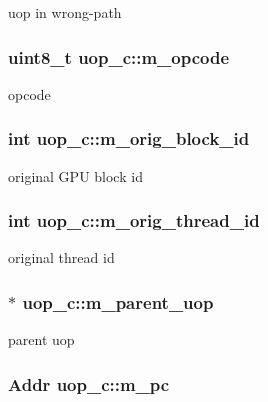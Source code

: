 \label{classuop__c_ad596fa360563f1642c09047c59481abe}
uop in wrong-\/path \hypertarget{classuop__c_aa9d298c300f17b0ffd24b3c994ddf667}{
\subsubsection[{m\_\-opcode}]{\setlength{\rightskip}{0pt plus 5cm}uint8\_\-t {\bf uop\_\-c::m\_\-opcode}}}
\label{classuop__c_aa9d298c300f17b0ffd24b3c994ddf667}
opcode \hypertarget{classuop__c_ac44b81eb2e89734fa5cded47ae8f275d}{
\subsubsection[{m\_\-orig\_\-block\_\-id}]{\setlength{\rightskip}{0pt plus 5cm}int {\bf uop\_\-c::m\_\-orig\_\-block\_\-id}}}
\label{classuop__c_ac44b81eb2e89734fa5cded47ae8f275d}
original GPU block id \hypertarget{classuop__c_a2203174651092ff60dd62029124c1ae1}{
\subsubsection[{m\_\-orig\_\-thread\_\-id}]{\setlength{\rightskip}{0pt plus 5cm}int {\bf uop\_\-c::m\_\-orig\_\-thread\_\-id}}}
\label{classuop__c_a2203174651092ff60dd62029124c1ae1}
original thread id \hypertarget{classuop__c_aa6452c76b89dca70a65638d11c7da8d7}{
\subsubsection[{m\_\-parent\_\-uop}]{$\ast$ {\bf uop\_\-c::m\_\-parent\_\-uop}}}
\label{classuop__c_aa6452c76b89dca70a65638d11c7da8d7}
parent uop \hypertarget{classuop__c_ae6f4147d85b5772d8fe5e0ad900aa9a2}{
\subsubsection[{m\_\-pc}]{\setlength{\rightskip}{0pt plus 5cm}Addr {\bf uop\_\-c::m\_\-pc}}}

